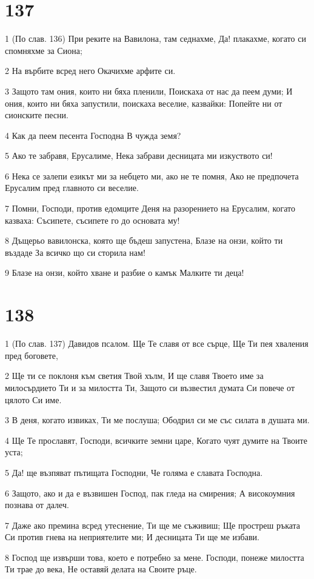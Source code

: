 \chapter{137}

\par 1 (По слав. 136) При реките на Вавилона, там седнахме, Да! плакахме, когато си спомняхме за Сиона;
\par 2 На върбите всред него Окачихме арфите си.
\par 3 Защото там ония, които ни бяха пленили, Поискаха от нас да пеем думи; И ония, които ни бяха запустили, поискаха веселие, казвайки: Попейте ни от сионските песни.
\par 4 Как да пеем песента Господна В чужда земя?
\par 5 Ако те забравя, Ерусалиме, Нека забрави десницата ми изкуството си!
\par 6 Нека се залепи езикът ми за небцето ми, ако не те помня, Ако не предпочета Ерусалим пред главното си веселие.
\par 7 Помни, Господи, против едомците Деня на разорението на Ерусалим, когато казваха: Съсипете, съсипете го до основата му!
\par 8 Дъщерьо вавилонска, която ще бъдеш запустена, Блазе на онзи, който ти въздаде За всичко що си сторила нам!
\par 9 Блазе на онзи, който хване и разбие о камък Малките ти деца!

\chapter{138}

\par 1 (По слав. 137) Давидов псалом. Ще Те славя от все сърце, Ще Ти пея хваления пред боговете,
\par 2 Ще ти се поклоня към светия Твой хълм, И ще славя Твоето име за милосърдието Ти и за милостта Ти, Защото си възвестил думата Си повече от цялото Си име.
\par 3 В деня, когато извиках, Ти ме послуша; Ободрил си ме със силата в душата ми.
\par 4 Ще Те прославят, Господи, всичките земни царе, Когато чуят думите на Твоите уста;
\par 5 Да! ще възпяват пътищата Господни, Че голяма е славата Господна.
\par 6 Защото, ако и да е възвишен Господ, пак гледа на смирения; А високоумния познава от далеч.
\par 7 Даже ако премина всред утеснение, Ти ще ме съживиш; Ще простреш ръката Си против гнева на неприятелите ми; И десницата Ти ще ме избави.
\par 8 Господ ще извърши това, което е потребно за мене. Господи, понеже милостта Ти трае до века, Не оставяй делата на Своите ръце.

